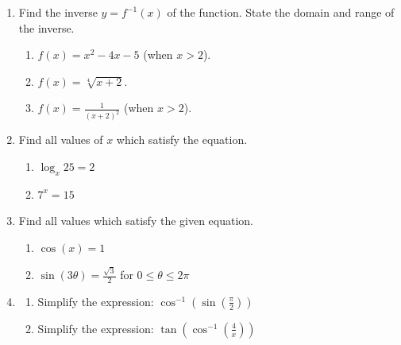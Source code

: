 \documentclass[handout,nooutcomes]{ximera}
\begin{document}
	\begin{enumerate}
			
				
	\item  Find the inverse $y=f^{-1}(x)$ of the function.  State the domain and range of the inverse.
	
			\begin{enumerate}
			\item  $f(x)=x^2-4x-5$ (when $x>2$).
			\item  $f(x)=\sqrt[4]{x+2}$.
			\item  $f(x)=\frac{1}{(x+2)^2}$  (when $x>2$).
			\end{enumerate}
	
	
	
	\item  Find all values of $x$ which satisfy the equation.
	
			\begin{enumerate}
			
			\item  $\log_x 25=2$ 
			
			\item  $7^x=15$ 
			
			\end{enumerate}
			
			
			\item  Find all values which satisfy the given equation.
	
			\begin{enumerate}
			
			\item  $\cos (x)=1$ 
			
			\item  $\sin (3 \theta )=\frac{\sqrt{3}}{2}$ for $0 \leq \theta \leq 2\pi $
			
			\end{enumerate}
			
			
			
	\item
	
			\begin{enumerate}
			
			\item  Simplify the expression:  $\cos^{-1} \left( \sin \left( \frac{\pi }{2} \right) \right) $ 
			
			\item  Simplify the expression:  $ \tan \left( \cos^{-1} \left( \frac{4}{x} \right) \right) $ 
			
			\end{enumerate}
			
			
			

	










								
				
				
	\end{enumerate}
\end{document}
